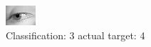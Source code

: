 \begin{figure}[h!]
\begin{center}
\includegraphics[width=0.60\columnwidth]{figures/ID2938_class_3_target_4.png}
\end{center}
\caption{ Classification: 3 actual target: 4}
\label{fig:ID2938_class_3_target_4}
\end{figure}
